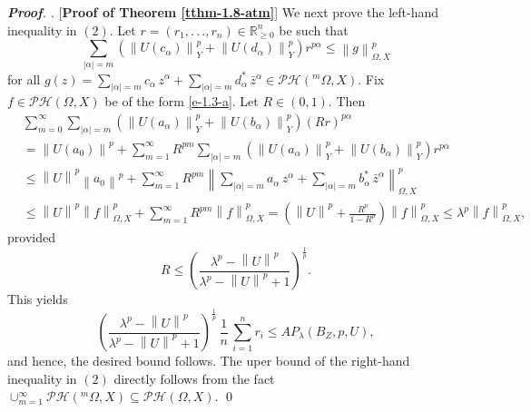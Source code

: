 \documentclass[a4paper,11pt, reqno]{amsart}
\theoremstyle{definition}
\newenvironment{pf}[1][]{%
	\vskip 3mm
	\noindent
	\ifthenelse{\equal{#1}{}}%
	{{\slshape {\bf Proof}. }}%
	{{\slshape #1.} }%
}%
{\qed\bigskip}
\newcommand{\norm}[1]{\left\lVert#1\right\rVert}
\begin{document}
\begin{pf} [{\bf Proof of Theorem \ref{tthm-1.8-atm}}]
	 We next prove the left-hand inequality in $(2)$. Let $r=(r_1,.\,.\,., r_n)\in \mathbb{R}^n_{\geq 0}$ be such that 
	\begin{equation*}
		\sum_{|\alpha|=m} (\norm{U(c_{\alpha})}^p_{Y} + \norm{U(d_{\alpha})}^p_{Y})r^{p \alpha} \leq \norm{g}^p_{\Omega, X}	
	\end{equation*}
	for all $g(z)=\sum_{|\alpha|=m} c_{\alpha}\, z^{\alpha} +  \sum_{|\alpha|=m} d^{*}_{\alpha}\, \bar{z}^{\alpha}\in \mathcal{PH}(^m\Omega,X)$. Fix $f\in \mathcal{PH}(\Omega,X)$ be of the form \eqref{e-1.3-a}. Let $R \in (0,1)$. Then 
	\begin{align} \label{ee-1.6-atm}
		&\sum_{m=0}^{\infty} \sum_{|\alpha|=m} (\norm{U(a_{\alpha})}^p_{Y} + \norm{U(b_{\alpha})}^p_{Y})(Rr)^{p \alpha}  \nonumber\\
		&= \norm{U(a_{0})}^p +  \sum_{m=1}^{\infty} R^{pm}\sum_{|\alpha|=m} (\norm{U(a_{\alpha})}^p_{Y} + \norm{U(b_{\alpha})}^p_{Y})r^{p \alpha} \nonumber\\ 
		& \leq \norm{U}^p \norm{a_{0}}^p +  \sum_{m=1}^{\infty} R^{pm}  \norm{\sum_{|\alpha|=m} a_{\alpha}\, z^{\alpha} +  \sum_{|\alpha|=m} b^{*}_{\alpha}\, \bar{z}^{\alpha}}^p_{\Omega,X} \\
		&\leq \norm{U}^p \norm{f}^p _{\Omega,X} + \sum_{m=1}^{\infty} R^{pm} \norm{f}^p _{\Omega,X}= \left(\norm{U}^p + \frac{R^p}{1-R^p}\right) \norm{f}^p _{\Omega,X} \leq  \lambda^p \norm{f}^p _{\Omega,X} ,\nonumber
	\end{align}
	provided 
	$$R \leq \left(\frac{\lambda^p - \norm{U}^p}{\lambda^p - \norm{U}^p +1}\right)^{\frac{1}{p}}.$$ This yields
	\begin{equation*}
		\left(\frac{\lambda^p - \norm{U}^p}{\lambda^p - \norm{U}^p+1}\right)^{\frac{1}{p}} \, \frac{1}{n} \, \sum_{i=1}^{n} r_{i} \leq AP_{\lambda}(B_{Z}, p,U),
	\end{equation*}
	and hence, the desired bound follows. The uper bound of the right-hand inequality in $(2)$ directly follows from the fact $\cup^{\infty}_{m=1} \mathcal{PH}(^m \Omega,X) \subseteq \mathcal{PH}(\Omega,X)$.
\end{pf}
\end{document}
